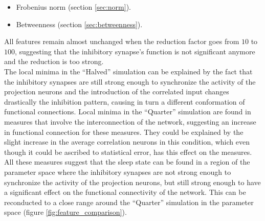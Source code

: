   \begin{itemize}
    \item Frobenius norm (section \ref{sec:norm}).
    \item Betweenness (section \ref{sec:betweenness}).
  \end{itemize}

  All features remain almost unchanged when the reduction factor goes from $10$ to $100$, suggesting that the inhibitory synapse's function is not significant anymore and the reduction is too strong.\\
  The local minima in the ``Halved'' simulation can be explained by the fact that the inhibitory synapses are still strong enough to synchronize the activity of the projection neurons and the introduction of the correlated input changes drastically the inhibition pattern, causing in turn a different conformation of functional connections.
  Local minima in the ``Quarter'' simulation are found in measures that involve the interconnection of the network, suggesting an increase in functional connection for these measures.
  They could be explained by the slight increase in the average correlation neurons in this condition, which even though it could be ascribed to statistical error, has this effect on the measures.\\
  All these measures suggest that the sleep state can be found in a region of the parameter space where the inhibitory synapses are not strong enough to synchronize the activity of the projection neurons, but still strong enough to have a significant effect on the functional connectivity of the network.
  This can be reconducted to a close range around the ``Quarter'' simulation in the parameter space (figure \ref{fig:feature_comparison}).

